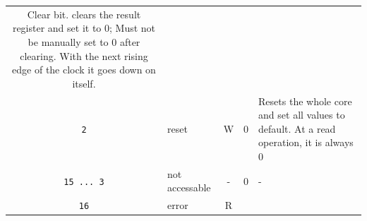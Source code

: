 \begin{table}
\begin{longtable}[]{@{}clccl@{}}
\begin{minipage}[t]{0.15\columnwidth}
				Clear bit. clears the result register and set it to 0; Must not be
				manually set to 0 after clearing. With the next rising edge of the clock
				it goes down on itself.\strut
				\end{minipage}\tabularnewline
				\begin{minipage}[t]{0.13\columnwidth}\centering\strut
					\texttt{2}\strut
					\end{minipage} & \begin{minipage}[t]{0.08\columnwidth}\raggedright\strut
					reset\strut
					\end{minipage} & \begin{minipage}[t]{0.12\columnwidth}\centering\strut
					W\strut
					\end{minipage} & \begin{minipage}[t]{0.17\columnwidth}\centering\strut
					0\strut
					\end{minipage} & \begin{minipage}[t]{0.15\columnwidth}\raggedright\strut
					Resets the whole core and set all values to default. At a read
					operation, it is always 0\strut
					\end{minipage}\tabularnewline
					\begin{minipage}[t]{0.13\columnwidth}\centering\strut
						\texttt{15\ ...\ 3}\strut
						\end{minipage} & \begin{minipage}[t]{0.08\columnwidth}\raggedright\strut
						not accessable\strut
						\end{minipage} & \begin{minipage}[t]{0.12\columnwidth}\centering\strut
						-\strut
						\end{minipage} & \begin{minipage}[t]{0.17\columnwidth}\centering\strut
						0\strut
						\end{minipage} & \begin{minipage}[t]{0.15\columnwidth}\raggedright\strut
						-\strut
						\end{minipage}\tabularnewline
						\begin{minipage}[t]{0.13\columnwidth}\centering\strut
							\texttt{16}\strut
							\end{minipage} & \begin{minipage}[t]{0.08\columnwidth}\raggedright\strut
							error\strut
							\end{minipage} & \begin{minipage}[t]{0.12\columnwidth}\centering\strut
							R\strut

\end{minipage}
\end{longtable}
\end{table}
